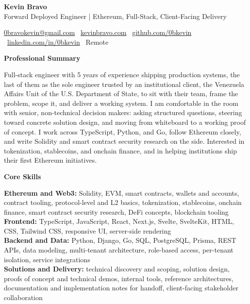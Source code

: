 \documentclass[11pt]{article}
\begin{document}
\begin{center}
    {\LARGE \textbf{Kevin Bravo}}\\
    Forward Deployed Engineer | Ethereum, Full-Stack, Client-Facing Delivery \\
    \hrulefill
\end{center}

\begin{center}
    \href{mailto:0bravokevin@gmail.com}{0bravokevin@gmail.com}
    \textbullet\
    \href{https://kevinbravo.com}{kevinbravo.com}
    \textbullet\
    \href{https://github.com/0bkevin}{github.com/0bkevin}
    \textbullet\
    \href{https://www.linkedin.com/in/0bkevin/}{linkedin.com/in/0bkevin}
    \textbullet\
Remote
\end{center}

\vspace{4pt}
\begin{center}
    \textbf{Professional Summary}
\end{center}
\vspace{-4pt}
Full-stack engineer with 5 years of experience shipping production systems, the last of them as the sole engineer trusted by an institutional client, the Venezuela Affairs Unit of the U.S. Department of State, to sit with their team, frame the problem, scope it, and deliver a working system. I am comfortable in the room with senior, non-technical decision makers: asking structured questions, steering toward concrete solution design, and moving from whiteboard to a working proof of concept. I work across TypeScript, Python, and Go, follow Ethereum closely, and write Solidity and smart contract security research on the side. Interested in tokenization, stablecoins, and onchain finance, and in helping institutions ship their first Ethereum initiatives.

\vspace{8pt}
\begin{center}
    \textbf{Core Skills}
\end{center}
\vspace{-4pt}
\textbf{Ethereum and Web3:} Solidity, EVM, smart contracts, wallets and accounts, contract tooling, protocol-level and L2 basics, tokenization, stablecoins, onchain finance, smart contract security research, DeFi concepts, blockchain tooling \\
\textbf{Frontend:} TypeScript, JavaScript, React, Next.js, Svelte, SvelteKit, HTML, CSS, Tailwind CSS, responsive UI, server-side rendering \\
\textbf{Backend and Data:} Python, Django, Go, SQL, PostgreSQL, Prisma, REST APIs, data modeling, multi-tenant architecture, role-based access, per-tenant isolation, service integrations \\
\textbf{Solutions and Delivery:} technical discovery and scoping, solution design, proofs of concept and technical demos, internal tools, reference architectures, documentation and implementation notes for handoff, client-facing stakeholder collaboration
\end{document}
